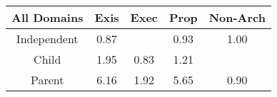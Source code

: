 \begin{tabular}{|c||c|c|c|c|}
\hline
All Domains & Exis & Exec & Prop & Non-Arch \\ 
\hline
Independent & \cellcolor[rgb]{0.7920839784584466,0.28186416470331366,0.3099450465612168} 0.87 &  & \cellcolor[rgb]{0.844749133804584,0.5311459000083648,0.35909919155094516} 0.93 & \cellcolor[rgb]{0.9099054606997337,0.8399552182261896,0.42} 1.00 \\ 
\hline
Child & \cellcolor[rgb]{0.8397891913147374,0.8067422485175071,0.41999999999999993} 1.95 & \cellcolor[rgb]{0.76,0.13,0.28} 0.83 & \cellcolor[rgb]{0.8943658410557079,0.83259434576323,0.42} 1.21 &  \\ 
\hline
Parent & \cellcolor[rgb]{0.53,0.66,0.42} 6.16 & \cellcolor[rgb]{0.8423653690348547,0.8079625432270364,0.42} 1.92 & \cellcolor[rgb]{0.5674513881820913,0.6777401312441486,0.42} 5.65 & \cellcolor[rgb]{0.822299065452922,0.4248822431438307,0.3381457944227272} 0.90 \\ 
\hline
\end{tabular}
